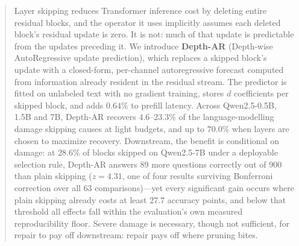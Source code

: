 \begin{abstract}
Layer skipping reduces Transformer inference cost by deleting entire residual
blocks, and the operator it uses implicitly assumes each deleted block's
residual update is zero. It is not: much of that update is predictable from
the updates preceding it. We introduce \textbf{Depth-AR} (Depth-wise
AutoRegressive update prediction), which replaces a skipped block's update
with a closed-form, per-channel autoregressive forecast computed from
information already resident in the residual stream. The predictor is fitted
on unlabeled text with no gradient training, stores $d$ coefficients per
skipped block, and adds $0.64\%$ to prefill latency. Across Qwen2.5-0.5B,
1.5B and 7B, Depth-AR recovers $4.6$--$23.3\%$ of the language-modelling
damage skipping causes at light budgets, and up to $70.0\%$ when layers are
chosen to maximize recovery. Downstream, the benefit is conditional on
damage: at $28.6\%$ of blocks skipped on Qwen2.5-7B under a deployable
selection rule, Depth-AR answers $89$ more questions correctly out of $900$
than plain skipping ($z = 4.31$, one of four results surviving Bonferroni
correction over all $63$ comparisons)---yet every significant gain occurs
where plain skipping already costs at least $27.7$ accuracy points, and below
that threshold all effects fall within the evaluation's own measured
reproducibility floor. Severe damage is necessary, though not sufficient, for
repair to pay off downstream: repair pays off where pruning bites.
\end{abstract}